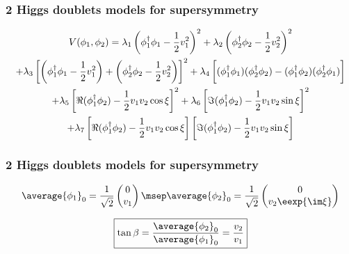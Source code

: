 \begin{frame}
\frametitle{2 Higgs doublets models for supersymmetry}
\begin{multline*}
V(\phi_1,\phi_2)
= \lambda_1 \left(\phi_1^\dagger\phi_1 - \frac{1}{2} v_1^2\right)^2
+ \lambda_2 \left(\phi_2^\dagger\phi_2 - \frac{1}{2} v_2^2\right)^2
\\
+ \lambda_3 \left[ \left(\phi_1^\dagger\phi_1 - \frac{1}{2} v_1^2\right) + \left(\phi_2^\dagger\phi_2 - \frac{1}{2} v_2^2\right) \right]^2
+ \lambda_4 \left[ (\phi_1^\dagger\phi_1)(\phi_2^\dagger\phi_2) - (\phi_1^\dagger\phi_2)(\phi_2^\dagger\phi_1) \vphantom{\frac{1}{2}}\right]
\\
+ \lambda_5 \left[ \Re(\phi_1^\dagger\phi_2) - \frac{1}{2} v_1v_2\cos\xi \right]^2
+ \lambda_6 \left[ \Im(\phi_1^\dagger\phi_2) - \frac{1}{2} v_1v_2\sin\xi \right]^2
\\
+ \lambda_7 \left[ \Re(\phi_1^\dagger\phi_2) - \frac{1}{2} v_1v_2\cos\xi \right]\left[ \Im(\phi_1^\dagger\phi_2) - \frac{1}{2} v_1v_2\sin\xi \right]
\end{multline*}
\end{frame}

\begin{frame}
\frametitle{2 Higgs doublets models for supersymmetry}
\begin{equation*}
\average{\phi_1}_0 = \frac{1}{\sqrt{2}} \begin{pmatrix}
0\\v_1
\end{pmatrix}
\msep
\average{\phi_2}_0 = \frac{1}{\sqrt{2}} \begin{pmatrix}
0\\v_2 \eexp{\im\xi}
\end{pmatrix}
\end{equation*}

\begin{equation*}
\boxed{\tan\beta = \frac{\average{\phi_2}_0}{\average{\phi_1}_0} = \frac{v_2}{v_1}}
\end{equation*}
\end{frame}

%

